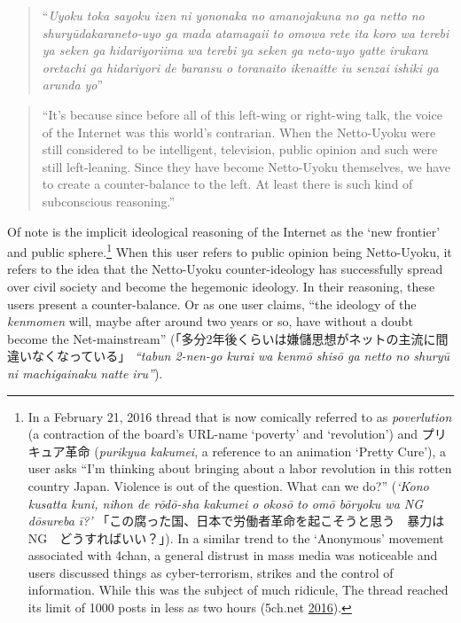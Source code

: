 \documentclass[10pt,british,A4paper,,openany]{memoir}
\begin{document}
\begin{quote}
``\emph{Uyoku toka sayoku izen ni yononaka no amanojakuna no ga netto no
shuryūdakara\newline neto-uyo ga mada atamagaii to omowa rete ita koro
wa terebi ya seken ga hidariyori\newline ima wa terebi ya seken ga
neto-uyo yatte irukara oretachi ga hidariyori de baransu o toranaito
ikenai\newline tte iu senzai ishiki ga arunda yo}''
\end{quote}

\begin{quote}
``It's because since before all of this left-wing or right-wing talk,
the voice of the Internet was this world's contrarian. When the
Netto-Uyoku were still considered to be intelligent, television, public
opinion and such were still left-leaning. Since they have become
Netto-Uyoku themselves, we have to create a counter-balance to the left.
At least there is such kind of subconscious reasoning.''
\end{quote}

Of note is the implicit ideological reasoning of the Internet as the
`new frontier' and public sphere.\footnote{In a February 21, 2016 thread
  that is now comically referred to as \emph{poverlution} (a contraction
  of the board's URL-name `poverty' and `revolution') and プリキュア革命
  (\emph{purikyua kakumei}, a reference to an animation `Pretty Cure'),
  a user asks ``I'm thinking about bringing about a labor revolution in
  this rotten country Japan. Violence is out of the question. What can
  we do?'' (\emph{`Kono kusatta kuni, nihon de rōdō-sha kakumei o okosō
  to omō bōryoku wa NG dōsureba ī?'}
  「この腐った国、日本で労働者革命を起こそうと思う　暴力はNG　どうすればいい？」).
  In a similar trend to the `Anonymous' movement associated with 4chan,
  a general distrust in mass media was noticeable and users discussed
  things as cyber-terrorism, strikes and the control of information.
  While this was the subject of much ridicule, The thread reached its
  limit of 1000 posts in less as two hours (5ch.net
  \protect\hyperlink{ref-5ch.net_eng._2016}{2016}).} When this user
refers to public opinion being Netto-Uyoku, it refers to the idea that
the Netto-Uyoku counter-ideology has successfully spread over civil
society and become the hegemonic ideology. In their reasoning, these
users present a counter-balance. Or as one user claims, ``the ideology
of the \emph{kenmomen} will, maybe after around two years or so, have
without a doubt become the Net-mainstream''
(「多分2年後くらいは嫌儲思想がネットの主流に間違いなくなっている」
\emph{``tabun 2-nen-go kurai wa kenmō shisō ga netto no shuryū ni
machigainaku natte iru''}).
\end{document}
